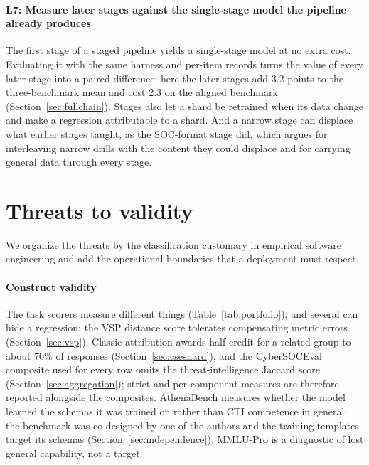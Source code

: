 \documentclass[a4paper,fleqn]{cas-dc}
\begin{document}
\paragraph{L7: Measure later stages against the single-stage model the pipeline already produces}
The first stage of a staged pipeline yields a single-stage model at no extra cost. Evaluating it with the same harness and per-item records turns the value of every later stage into a paired difference: here the later stages add 3.2 points to the three-benchmark mean and cost 2.3 on the aligned benchmark (Section~\ref{sec:fullchain}). Stages also let a shard be retrained when its data change and make a regression attributable to a shard. And a narrow stage can displace what earlier stages taught, as the SOC-format stage did, which argues for interleaving narrow drills with the content they could displace and for carrying general data through every stage.

\section{Threats to validity}\label{sec:limits}
We organize the threats by the classification customary in empirical software engineering \citep{wohlin2012experimentation} and add the operational boundaries that a deployment must respect.

\paragraph{Construct validity}
The task scorers measure different things (Table~\ref{tab:portfolio}), and several can hide a regression: the VSP distance score tolerates compensating metric errors (Section~\ref{sec:vsp}), Classic attribution awards half credit for a related group to about 70\% of responses (Section~\ref{sec:cseshard}), and the CyberSOCEval composite used for every row omits the threat-intelligence Jaccard score (Section~\ref{sec:aggregation}); strict and per-component measures are therefore reported alongside the composites. AthenaBench measures whether the model learned the schemas it was trained on rather than CTI competence in general: the benchmark was co-designed by one of the authors and the training templates target its schemas (Section~\ref{sec:independence}). MMLU-Pro is a diagnostic of lost general capability, not a target.
\end{document}
